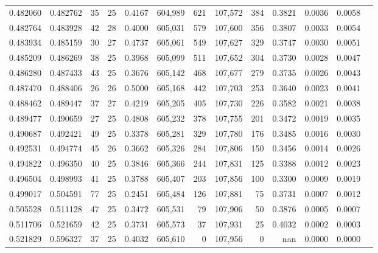 \begin{tabular}{rrrrrrrrrrrrr}
0.482060 & 0.482762 &    35 &  25 &                                     0.4167 & 604,989 &     621 & 107,572 &     384 & 0.3821 & 0.0036 & 0.0058 \\
0.482764 & 0.483928 &    42 &  28 &                                     0.4000 & 605,031 &     579 & 107,600 &     356 & 0.3807 & 0.0033 & 0.0054 \\
0.483934 & 0.485159 &    30 &  27 &                                     0.4737 & 605,061 &     549 & 107,627 &     329 & 0.3747 & 0.0030 & 0.0051 \\
0.485209 & 0.486269 &    38 &  25 &                                     0.3968 & 605,099 &     511 & 107,652 &     304 & 0.3730 & 0.0028 & 0.0047 \\
0.486280 & 0.487433 &    43 &  25 &                                     0.3676 & 605,142 &     468 & 107,677 &     279 & 0.3735 & 0.0026 & 0.0043 \\
0.487470 & 0.488406 &    26 &  26 &                                     0.5000 & 605,168 &     442 & 107,703 &     253 & 0.3640 & 0.0023 & 0.0041 \\
0.488462 & 0.489447 &    37 &  27 &                                     0.4219 & 605,205 &     405 & 107,730 &     226 & 0.3582 & 0.0021 & 0.0038 \\
0.489477 & 0.490659 &    27 &  25 &                                     0.4808 & 605,232 &     378 & 107,755 &     201 & 0.3472 & 0.0019 & 0.0035 \\
0.490687 & 0.492421 &    49 &  25 &                                     0.3378 & 605,281 &     329 & 107,780 &     176 & 0.3485 & 0.0016 & 0.0030 \\
0.492531 & 0.494774 &    45 &  26 &                                     0.3662 & 605,326 &     284 & 107,806 &     150 & 0.3456 & 0.0014 & 0.0026 \\
0.494822 & 0.496350 &    40 &  25 &                                     0.3846 & 605,366 &     244 & 107,831 &     125 & 0.3388 & 0.0012 & 0.0023 \\
0.496504 & 0.498993 &    41 &  25 &                                     0.3788 & 605,407 &     203 & 107,856 &     100 & 0.3300 & 0.0009 & 0.0019 \\
0.499017 & 0.504591 &    77 &  25 &                                     0.2451 & 605,484 &     126 & 107,881 &      75 & 0.3731 & 0.0007 & 0.0012 \\
0.505528 & 0.511128 &    47 &  25 &                                     0.3472 & 605,531 &      79 & 107,906 &      50 & 0.3876 & 0.0005 & 0.0007 \\
0.511706 & 0.521659 &    42 &  25 &                                     0.3731 & 605,573 &      37 & 107,931 &      25 & 0.4032 & 0.0002 & 0.0003 \\
0.521829 & 0.596327 &    37 &  25 &                                     0.4032 & 605,610 &       0 & 107,956 &       0 &    nan & 0.0000 & 0.0000 \\
\bottomrule
\end{tabular}
